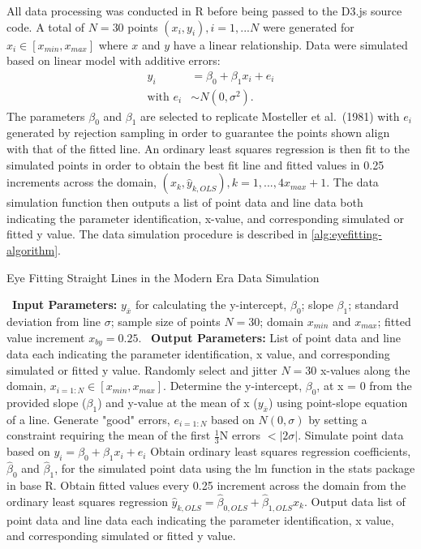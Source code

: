 \documentclass[12pt]{article}
\begin{document}
All data processing was conducted in R before being passed to the D3.js
source code. A total of \(N = 30\) points \((x_i, y_i), i = 1,...N\)
were generated for \(x_i \in [x_{min}, x_{max}]\) where \(x\) and \(y\)
have a linear relationship. Data were simulated based on linear model
with additive errors: \begin{align}
y_i & = \beta_0 + \beta_1 x_i + e_i \\
\text{with } e_i & \sim N(0, \sigma^2). \nonumber
\end{align} The parameters \(\beta_0\) and \(\beta_1\) are selected to
replicate Mosteller et al.~(1981) with \(e_i\) generated by rejection
sampling in order to guarantee the points shown align with that of the
fitted line. An ordinary least squares regression is then fit to the
simulated points in order to obtain the best fit line and fitted values
in 0.25 increments across the domain,
\((x_k, \hat y_{k,OLS}), k = 1, ..., 4 x_{max} +1\). The data simulation
function then outputs a list of point data and line data both indicating
the parameter identification, x-value, and corresponding simulated or
fitted y value. The data simulation procedure is described in
\cref{alg:eyefitting-algorithm}.

\begin{algorithm}
  \caption{Eye Fitting Straight Lines in the Modern Era Data Simulation}\label{alg:eyefitting-algorithm}
  \begin{algorithmic}[1]
    \Statex \textbullet~\textbf{Input Parameters:} $y_{\bar{x}}$ for calculating the y-intercept, $\beta_0$; slope $\beta_1$; standard deviation from line $\sigma$; sample size of points $N = 30$; domain $x_{min}$ and $x_{max}$; fitted value increment $x_{by} = 0.25$.
    \Statex \textbullet~\textbf{Output Parameters:} List of point data and line data each indicating the parameter identification, x value, and corresponding simulated or fitted y value.
    \State Randomly select and jitter $N = 30$ x-values along the domain, $x_{i=1:N}\in [x_{min}, x_{max}]$.
    \State Determine the y-intercept, $\beta_0$, at x = 0 from the provided slope ($\beta_1$) and y-value at the mean of x ($y_{\bar{x}}$) using point-slope equation of a line.
    \State Generate "good" errors, $e_{i = 1:N}$ based on $N(0,\sigma)$ by setting a constraint requiring the mean of the first $\frac{1}{3}\text{N}$ errors $< |2\sigma|.$
    \State Simulate point data based on $y_i = \beta_0 + \beta_1 x_i + e_i$
    \State Obtain ordinary least squares regression coefficients, $\hat\beta_0$ and $\hat\beta_1$, for the simulated point data using the lm function in the stats package in base R.
    \State Obtain fitted values every 0.25 increment across the domain from the ordinary least squares regression $\hat y_{k,OLS} = \hat\beta_{0,OLS} + \hat\beta_{1,OLS} x_k$.
    \State Output data list of point data and line data each indicating the parameter identification, x value, and corresponding simulated or fitted y value.
  \end{algorithmic}
\end{algorithm}
\end{document}

